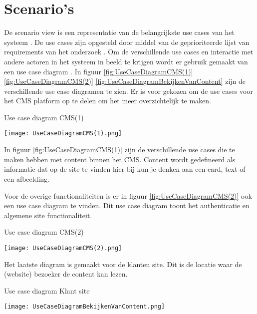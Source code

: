 \section{Scenario's}
De scenario view is een representatie van de belangrijkste use cases van het systeem \parencite{4+1ViewModelPaper}.
De use cases zijn opgesteld door middel van de geprioriteerde lijst van requirements van het onderzoek \parencite{DanteOnderzoek}.
Om de verschillende use cases en interactie met andere actoren in het systeem in beeld te krijgen wordt er gebruik gemaakt van een use case diagram \parencite{UseCaseDiagram}.
In figuur \ref{fig:UseCaseDiagramCMS(1)} \ref{fig:UseCaseDiagramCMS(2)} \ref{fig:UseCaseDiagramBekijkenVanContent} zijn de verschillende use case diagramen te zien.
Er is voor gekozen om de use cases voor het CMS platform op te delen om het meer overzichtelijk te maken.

\whitespace[2]
\begin{graphic}
	\captionsetup{type=figure}
	\caption{Use case diagram CMS(1)}
	\texttt{[image: UseCaseDiagramCMS(1).png]}
	\label{fig:UseCaseDiagramCMS(1)}
\end{graphic}

\whitespace[2]
In figuur \ref{fig:UseCaseDiagramCMS(1)} zijn de verschillende use cases die te maken hebben met content binnen het CMS.
Content wordt gedefineerd als informatie dat op de site te vinden hier bij kun je denken aan een card, text of een afbeelding.
 
\newpage

\whitespace
Voor de overige functionaliteiten is er in figuur \ref{fig:UseCaseDiagramCMS(2)} ook een use case diagram te vinden.
Dit use case diagram toont het authenticatie en algemene site functionaliteit.

\whitespace
\begin{graphic}
	\captionsetup{type=figure}
	\caption{Use case diagram CMS(2)}
	\texttt{[image: UseCaseDiagramCMS(2).png]}
	\label{fig:UseCaseDiagramCMS(2)}
\end{graphic}

\whitespace
Het laatste diagram is gemaakt voor de klanten site.
Dit is de locatie waar de (website) bezoeker de content kan lezen.

\whitespace
\begin{graphic}
	\captionsetup{type=figure}
	\caption{Use case diagram Klant site}
	\texttt{[image: UseCaseDiagramBekijkenVanContent.png]}
	\label{fig:UseCaseDiagramBekijkenVanContent}
\end{graphic}
